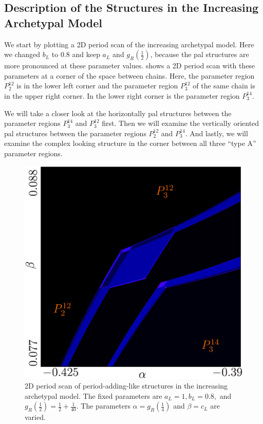 \subsection{Description of the Structures in the Increasing Archetypal Model}
\label{sec:add.add.like}

We start by plotting a 2D period scan of the increasing archetypal model.
Here we changed $b_L$ to $0.8$ and keep $a_L$ and $g_R\left(\frac{1}{2}\right)$, because the \gls{pal} structures are more pronounced at these parameter values.
 shows a 2D period scan with these parameters at a corner of the space between chains.
Here, the parameter region $P^{12}_2$ is in the lower left corner and the parameter region $P^{12}_3$ of the same chain is in the upper right corner.
In the lower right corner is the parameter region $P^{14}_3$.

We will take a closer look at the horizontally \gls{pal} structures between the parameter regions $P^{14}_3$ and $P^{12}_3$ first.
Then we will examine the vertically oriented \gls{pal} structures between the parameter regions $P^{12}_2$ and $P^{14}_3$.
And lastly, we will examine the complex looking structure in the corner between all three ``type A'' parameter regions.

\begin{figure}
	\centering
	\includegraphics[width=.7 \textwidth]{../Figures/7/7.11/result.png}
	\caption[2D period scan of period-adding-like structures in the increasing archetypal model]{
		2D period scan of period-adding-like structures in the increasing archetypal model.
		The fixed parameters are $a_L = 1, b_L = 0.8,$ and $g_R\left(\frac{1}{2}\right) = \frac{1}{2} + \frac{1}{40}$.
		The parameters $\alpha = g_R\left(\frac{1}{4}\right)$ and $\beta = c_L$ are varied.
	}
	\label{fig:add.add.like}
\end{figure}

